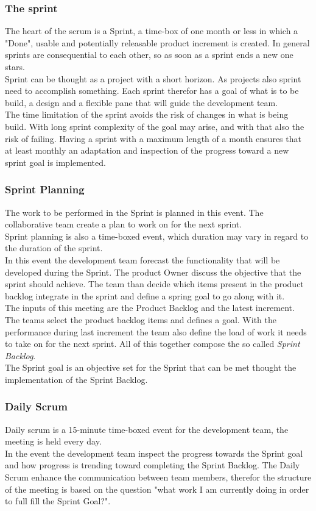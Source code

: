 \documentclass[../main.tex]{subfiles}
\begin{document}
\subsubsection{The sprint}
The heart of the scrum is a Sprint, a time-box of one month or less in which a "Done", usable and potentially releasable product increment is created. In general sprints are consequential to each other, so as soon as a sprint ends a new one stars. \\
Sprint can be thought as a project with a short horizon. As projects also sprint need to accomplish something. Each sprint therefor has a goal of what is to be build, a design and a flexible pane that will guide the development team.\\
The time limitation of the sprint avoids the risk of changes in what is being build. With long sprint complexity of the goal may arise, and with that also the risk of failing. Having a sprint with a maximum length of a month ensures that at least monthly an adaptation and inspection of the progress toward a new sprint goal is implemented. 
\subsubsection{Sprint Planning}
The work to be performed in the Sprint is planned in this event. The collaborative team create a plan to work on for the next sprint. \\
Sprint planning is also a time-boxed event, which duration may vary in regard to the duration of the sprint.\\
In this event the development team forecast the functionality that will be developed during the Sprint. The product Owner discuss the objective that the sprint should achieve. The team than decide which items present in the product backlog integrate in the sprint and define a spring goal to go along with it.\\
The inputs of this meeting are the Product Backlog and the latest increment. The teams select the product backlog items and defines a goal. With the performance during last increment the team also define the load of work it needs to take on for the next sprint. All of this together compose the so called \textit{Sprint Backlog}.\\
The Sprint goal is an objective set for the Sprint that can be met thought the implementation of the Sprint Backlog. 
\subsubsection{Daily Scrum}
Daily scrum is a 15-minute time-boxed event for the development team, the meeting is held every day.\\
In the event the development team inspect the progress towards the Sprint goal and how progress is trending toward completing the Sprint Backlog. The Daily Scrum enhance the communication between team members, therefor the structure of the meeting is based on the question "what work I am currently doing in order to full fill the Sprint Goal?".
\end{document}
